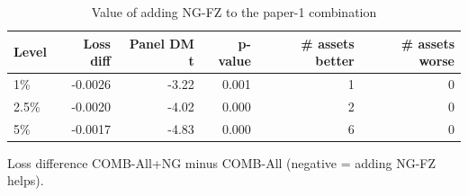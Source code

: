 \begin{table}[htbp]
\centering
\footnotesize
\caption{Value of adding NG-FZ to the paper-1 combination}
\label{tab:combo_ng}
\begin{tabular}{lrrrrr}
\toprule
Level & Loss diff & Panel DM t & p-value & \# assets better & \# assets worse \\
\midrule
1\% & -0.0026 & -3.22 & 0.001 & 1 & 0 \\
2.5\% & -0.0020 & -4.02 & 0.000 & 2 & 0 \\
5\% & -0.0017 & -4.83 & 0.000 & 6 & 0 \\
\bottomrule
\end{tabular}
\par\smallskip\parbox{\linewidth}{\scriptsize Loss difference COMB-All+NG minus COMB-All (negative = adding NG-FZ helps).}
\end{table}